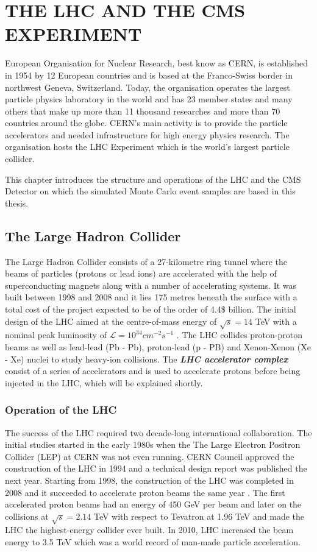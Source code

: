 \chapter{THE LHC AND THE CMS EXPERIMENT}\label{Ch2}

European Organisation for Nuclear Research, best know as CERN, is established in 1954 by 12 European countries and is based at the Franco-Swiss border in northwest Geneva, Switzerland. Today, the organisation operates the largest particle physics laboratory in the world and has 23 member states \cite{CERN:2771424} and many others that make up more than 11 thousand researches and more than 70 countries around the globe. CERN's main activity is to provide the particle accelerators and needed infrastructure for high energy physics research. The organisation hosts the LHC Experiment which is the world's largest particle collider.

This chapter introduces the structure and operations of the LHC and the CMS Detector on which the simulated Monte Carlo event samples are based in this thesis.

\section{The Large Hadron Collider}

The Large Hadron Collider consists of a 27-kilometre ring tunnel where the beams of particles (protons or lead ions) are accelerated with the help of superconducting magnets along with a number of accelerating systems. It was built between 1998 and 2008 and it lies 175 metres beneath the surface with a total cost of the project expected to be of the order of 4.4\$ billion. The initial design of the LHC aimed at the centre-of-mass energy of $\sqrt{s}=14$ TeV with a nominal peak luminosity of $\mathcal{L} = 10^{34}cm^{-2}s^{-1}$ \cite{Baconnier:257706}. The LHC collides proton-proton beams as well as lead-lead (Pb - Pb), proton-lead (p - PB) and Xenon-Xenon (Xe - Xe) nuclei to study heavy-ion collisions. The \textbf{\emph{LHC accelerator complex}} consist of a series of accelerators and is used to accelerate protons before being injected in the LHC, which will be explained shortly.

\subsection{Operation of the LHC}

The success of the LHC required two decade-long international collaboration. The initial studies started in the early 1980s when the The Large Electron Positron Collider (LEP) at CERN was not even running. CERN Council approved the construction of the LHC in 1994 and a technical design report was published the next year. Starting from 1998, the construction of the LHC was completed in 2008 and it succeeded to accelerate proton beams the same year \cite{lhcfirstbeams}. The first accelerated proton beams had an energy of 450 GeV per beam and later on the collisions at $\sqrt{s}=2.14$ TeV with respect to Tevatron at 1.96 TeV and made the LHC the highest-energy collider ever built. In 2010, LHC increased the beam energy to 3.5 TeV which was a world record of man-made particle acceleration.

